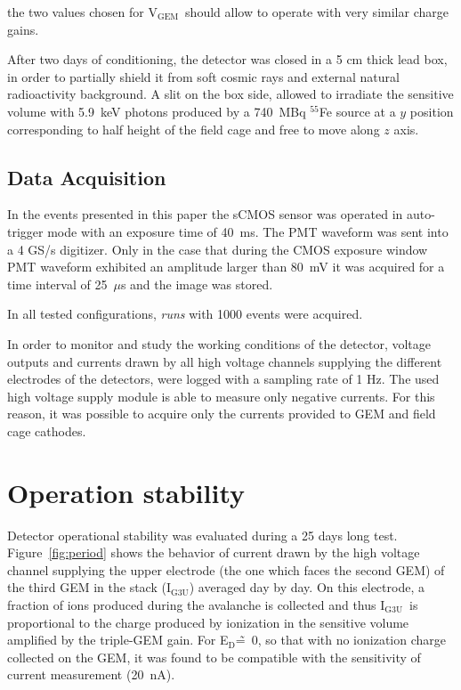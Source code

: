 \documentclass[a4paper,11pt]{article}
\newcommand{\Ig}  {I$_{\mathrm{G3U}}$}
\newcommand{\Ed}  {E$_{\mathrm{D}}$}
\newcommand{\Vg}  {V$_{\mathrm{GEM}}$}
\begin{document}
the two values chosen for \Vg\ should allow to operate with very similar charge gains.

After two days of conditioning, the detector was closed in a 5 cm thick lead box, in order to partially shield it from soft cosmic rays and external natural radioactivity background. A slit on the box side, allowed to irradiate the sensitive volume with 5.9~keV photons produced by a 740~MBq $^{55}$Fe source at a $y$ position corresponding to half height of the field cage and free to move along $z$ axis.

\subsection{Data Acquisition}
\label{sec:daq}

In the events presented in this paper the sCMOS sensor 
was operated in auto-trigger mode with an exposure time of 40~ms.
The PMT waveform was sent into a 4 GS/s digitizer.
Only in the case that during the CMOS exposure window PMT waveform exhibited an amplitude larger than 80~mV it was acquired for a time interval of 25~$\mu$s and the image was stored.

In all tested configurations, {\it runs} with 1000 events were acquired.

In order to monitor and study the working conditions of the detector, voltage outputs and currents drawn by all high voltage channels supplying the different electrodes of the detectors, were logged with a sampling rate of 1 Hz. The used high voltage supply module is able to measure only negative currents. For this reason, it was possible to acquire only the currents provided to GEM and field cage cathodes.


\section{Operation stability}

Detector operational stability was evaluated during a 25 days long test. 
Figure~\ref{fig:period} shows the behavior of current drawn by the high voltage channel supplying the upper electrode (the one which faces the second GEM) of the third GEM in the stack (\Ig) averaged day by day. On this electrode, a fraction of ions produced during the avalanche is collected and thus \Ig\ is proportional to the charge produced by ionization in the sensitive volume amplified by the triple-GEM gain.  
For \Ed\~=~0, so that with no ionization charge collected on the GEM, it was found to be compatible with the sensitivity of current measurement (20~nA).
\end{document}

